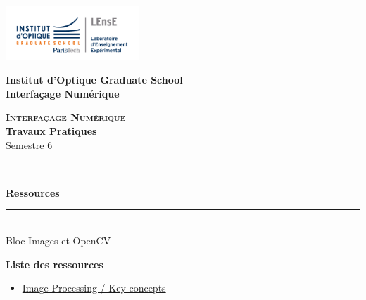 \documentclass[a4paper,11pt,titlepage]{article} %
\begin{document}
\newpage
\begin{center}
	\begin{minipage}{2.5cm}
	\begin{center}
		\includegraphics[width=5cm]{images/Logo-LEnsE.png}
	\end{center}
\end{minipage}\hfill
\begin{minipage}{10cm}
	\begin{center}
	\textbf{Institut d'Optique Graduate School }\\[0.1cm]
    \textbf{Interfaçage Numérique}


	\end{center}
\end{minipage}\hfill


\vspace{2cm}


{\Large \bfseries \textsc{Interfaçage Numérique}} \\[0.5cm]
{\large \bfseries Travaux Pratiques} \\[0.2cm]
Semestre 6

\vspace{1cm}

\rule{\linewidth}{0.4mm} \\[0.4cm]
{ \Large \bfseries\color{violet_iogs} Ressources \\[0.4cm] }
\rule{\linewidth}{0.4mm} \\[1cm]
{\large Bloc Images et OpenCV}

\end{center}

\vspace{3cm}

\textbf{\large Liste des ressources}
\begin{itemize}
	\item \hyperref[doc:image_proc]{Image Processing / Key concepts}
\end{itemize}

\vfill

\newpage
\strut %




\end{document}
